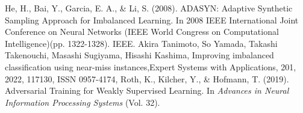 \begin{singlespace}
\begin{thebibliography}{}
     He, H., Bai, Y., Garcia, E. A., \& Li, S. (2008). ADASYN: Adaptive Synthetic Sampling Approach for Imbalanced Learning. In 2008 IEEE International Joint Conference on Neural Networks (IEEE World Congress on Computational Intelligence)(pp. 1322-1328). IEEE.
     Akira Tanimoto, So Yamada, Takashi Takenouchi, Masashi Sugiyama, Hisashi Kashima, Improving imbalanced classification using near-miss instances,Expert Systems with Applications, 201, 2022, 117130, ISSN 0957-4174, 
     Roth, K., Kilcher, Y., \& Hofmann, T. (2019). Adversarial Training for Weakly Supervised Learning. In \textit{Advances in Neural Information Processing Systems} (Vol. 32).








    


    














\end{thebibliography}
\end{singlespace}
